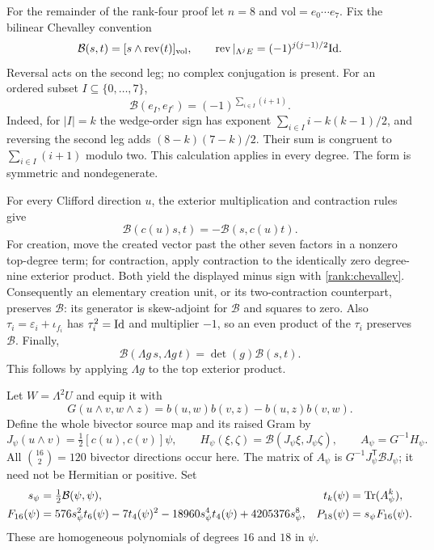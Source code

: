 For the remainder of the rank-four proof let $n=8$ and
$\mathrm{vol}=e_0\cdots e_7$. Fix the bilinear Chevalley convention
\begin{equation}
 \mathcal B(s,t)=[s\wedge\operatorname{rev}(t)]_{\mathrm{vol}},\qquad
 \operatorname{rev}|_{\Lambda^jE}=(-1)^{j(j-1)/2}\mathrm{Id}.
 \label{rank:chevalley}
\end{equation}
Reversal acts on the second leg; no complex conjugation is present.
For an ordered subset $I\subseteq\{0,\ldots,7\}$,
\begin{equation}
 \mathcal B(e_I,e_{I^c})=(-1)^{\sum_{i\in I}(i+1)}.
 \label{rank:chevalley-sign}
\end{equation}
Indeed, for $|I|=k$ the wedge-order sign has exponent
$\sum_{i\in I}i-k(k-1)/2$, and reversing the second leg adds
$(8-k)(7-k)/2$. Their sum is congruent to
$\sum_{i\in I}(i+1)$ modulo two. This calculation applies in every degree.
The form is symmetric and nondegenerate.

For every Clifford direction $u$, the exterior multiplication and
contraction rules give
\begin{equation}
 \mathcal B(c(u)s,t)=-\mathcal B(s,c(u)t).
 \label{rank:bilinear-adjoint}
\end{equation}
For creation, move the created vector past the other seven factors in a
nonzero top-degree term; for contraction, apply contraction to the
identically zero degree-nine exterior product. Both yield the displayed
minus sign with \eqref{rank:chevalley}. Consequently an elementary
creation unit, or its two-contraction counterpart, preserves $\mathcal B$:
its generator is skew-adjoint for $\mathcal B$ and squares to zero.
Also $\tau_i=\varepsilon_i+\iota_{f_i}$ has $\tau_i^2=\mathrm{Id}$ and multiplier
$-1$, so an even product of the $\tau_i$ preserves $\mathcal B$.
Finally,
\begin{equation}
 \mathcal B(\Lambda g\,s,\Lambda g\,t)
       =\det(g)\mathcal B(s,t).
 \label{rank:gl-multiplier}
\end{equation}
This follows by applying $\Lambda g$ to the top exterior product.

Let $W=\Lambda^2U$ and equip it with
\[
 G(u\wedge v,w\wedge z)=b(u,w)b(v,z)-b(u,z)b(v,w).
\]
Define the whole bivector source map and its raised Gram by
\begin{equation}
 J_\psi(u\wedge v)=\tfrac12[c(u),c(v)]\psi,\qquad
 H_\psi(\xi,\zeta)=\mathcal B(J_\psi\xi,J_\psi\zeta),\qquad
 A_\psi=G^{-1}H_\psi.
 \label{rank:full-gram}
\end{equation}
All $\binom{16}{2}=120$ bivector directions occur here.
The matrix of $A_\psi$ is $G^{-1}J_\psi^{\mathsf T}\mathcal BJ_\psi$;
it need not be Hermitian or positive. Set
\begin{align}
 s_\psi&=\tfrac12\mathcal B(\psi,\psi),&
 t_k(\psi)&=\operatorname{Tr}(A_\psi^k),\label{rank:moments}\\
 F_{16}(\psi)&=576s_\psi^2t_6(\psi)-7t_4(\psi)^2
 -18960s_\psi^4t_4(\psi)+4205376s_\psi^8,&
 P_{18}(\psi)&=s_\psi F_{16}(\psi).
 \label{rank:polynomial}
\end{align}
These are homogeneous polynomials of degrees $16$ and $18$ in $\psi$.

